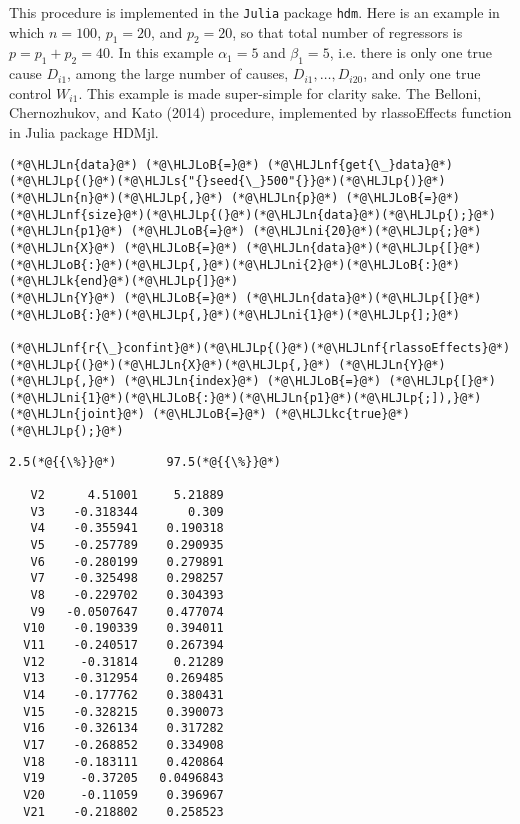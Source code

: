 \documentclass[12pt,a4paper]{article}
\newcommand{\HLJLk}[1]{\textcolor[RGB]{148,91,176}{\textbf{#1}}}
\newcommand{\HLJLkc}[1]{\textcolor[RGB]{59,151,46}{\textit{#1}}}
\newcommand{\HLJLn}[1]{#1}
\newcommand{\HLJLnf}[1]{\textcolor[RGB]{66,102,213}{#1}}
\newcommand{\HLJLs}[1]{\textcolor[RGB]{201,61,57}{#1}}
\newcommand{\HLJLni}[1]{\textcolor[RGB]{59,151,46}{#1}}
\newcommand{\HLJLoB}[1]{\textcolor[RGB]{102,102,102}{\textbf{#1}}}
\newcommand{\HLJLp}[1]{#1}
\begin{document}
This procedure is implemented in the \texttt{Julia} package \texttt{hdm}. Here is an example in which $n = 100$, $p_1 = 20$, and $p_2 = 20$, so that total number of regressors is $p = p_1 + p_2 = 40$. In this example $\alpha_1 = 5$ and $\beta_1 = 5$, i.e. there is only one true cause $D_{i1}$, among the large number of causes, $D_{i1}, \dots, D_{i20}$, and only one true control $W_{i1}$. This example is made super-simple for clarity sake. The Belloni, Chernozhukov, and Kato (2014) procedure, implemented by rlassoEffects function in Julia package HDMjl.


\begin{lstlisting}
(*@\HLJLn{data}@*) (*@\HLJLoB{=}@*) (*@\HLJLnf{get{\_}data}@*)(*@\HLJLp{(}@*)(*@\HLJLs{"{}seed{\_}500"{}}@*)(*@\HLJLp{)}@*)
(*@\HLJLn{n}@*)(*@\HLJLp{,}@*) (*@\HLJLn{p}@*) (*@\HLJLoB{=}@*) (*@\HLJLnf{size}@*)(*@\HLJLp{(}@*)(*@\HLJLn{data}@*)(*@\HLJLp{);}@*)
(*@\HLJLn{p1}@*) (*@\HLJLoB{=}@*) (*@\HLJLni{20}@*)(*@\HLJLp{;}@*)
(*@\HLJLn{X}@*) (*@\HLJLoB{=}@*) (*@\HLJLn{data}@*)(*@\HLJLp{[}@*)(*@\HLJLoB{:}@*)(*@\HLJLp{,}@*)(*@\HLJLni{2}@*)(*@\HLJLoB{:}@*)(*@\HLJLk{end}@*)(*@\HLJLp{]}@*)
(*@\HLJLn{Y}@*) (*@\HLJLoB{=}@*) (*@\HLJLn{data}@*)(*@\HLJLp{[}@*)(*@\HLJLoB{:}@*)(*@\HLJLp{,}@*)(*@\HLJLni{1}@*)(*@\HLJLp{];}@*)

(*@\HLJLnf{r{\_}confint}@*)(*@\HLJLp{(}@*)(*@\HLJLnf{rlassoEffects}@*)(*@\HLJLp{(}@*)(*@\HLJLn{X}@*)(*@\HLJLp{,}@*) (*@\HLJLn{Y}@*)(*@\HLJLp{,}@*) (*@\HLJLn{index}@*) (*@\HLJLoB{=}@*) (*@\HLJLp{[}@*)(*@\HLJLni{1}@*)(*@\HLJLoB{:}@*)(*@\HLJLn{p1}@*)(*@\HLJLp{;]),}@*) (*@\HLJLn{joint}@*) (*@\HLJLoB{=}@*) (*@\HLJLkc{true}@*)(*@\HLJLp{);}@*)
\end{lstlisting}

\begin{lstlisting}
2.5(*@{{\%}}@*)       97.5(*@{{\%}}@*)

   V2      4.51001     5.21889
   V3    -0.318344       0.309
   V4    -0.355941    0.190318
   V5    -0.257789    0.290935
   V6    -0.280199    0.279891
   V7    -0.325498    0.298257
   V8    -0.229702    0.304393
   V9   -0.0507647    0.477074
  V10    -0.190339    0.394011
  V11    -0.240517    0.267394
  V12     -0.31814     0.21289
  V13    -0.312954    0.269485
  V14    -0.177762    0.380431
  V15    -0.328215    0.390073
  V16    -0.326134    0.317282
  V17    -0.268852    0.334908
  V18    -0.183111    0.420864
  V19     -0.37205   0.0496843
  V20     -0.11059    0.396967
  V21    -0.218802    0.258523
\end{lstlisting}
\end{document}
